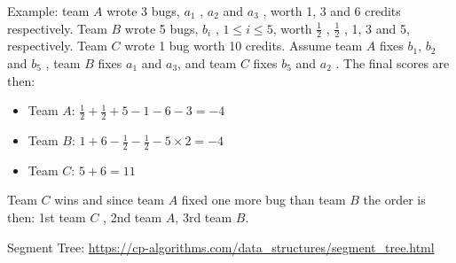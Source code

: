 \documentclass[11pt,a4paper]{article}
\begin{document}
Example: team $A$ wrote 3 bugs, $a_1$ , $a_2$ and $a_3$ , worth 1, 3 and 6 credits respectively. Team $B$ wrote 5
bugs, $b_i$ , $1 \leqslant i \leqslant 5$, worth $\frac{1}{2}$ , $\frac{1}{2}$ , 1, 3 and 5, respectively. Team $C$ wrote 1 bug worth 10 credits. Assume
team $A$ fixes $b_1$, $b_2$ and $b_5$ , team $B$ fixes $a_1$ and $a_3$, and team $C$ fixes $b_5$ and $a_2$ . The final scores are
then:

\begin{itemize}
  \item Team $A$: $\frac{1}{2}+\frac{1}{2}+5-1-6-3=-4$
  \item Team $B$: $1+6-\frac{1}{2}-\frac{1}{2}-5\times2=-4$
  \item Team $C$: $5+6=11$
\end{itemize}

Team $C$ wins and since team $A$ fixed one more bug than team $B$ the order is then: 1st team $C$ , 2nd team $A$, 3rd team $B$.







\begin{thebibliography}{9}
  Segment Tree: \url{https://cp-algorithms.com/data_structures/segment_tree.html
  }
\end{thebibliography}
\end{document}
